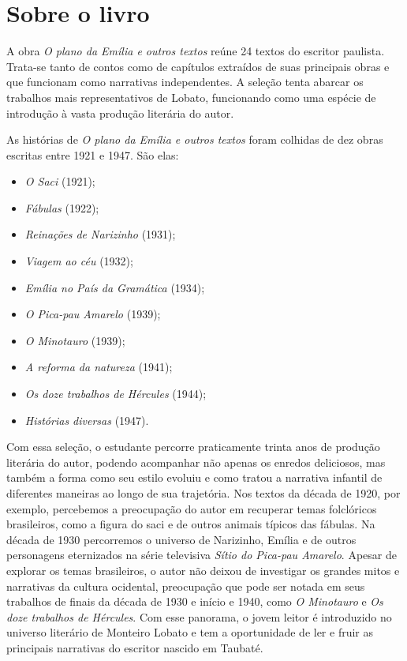 \documentclass[11pt]{extarticle}
\begin{document}
\section{Sobre o livro}
A obra \textit{O plano da Emília e outros textos} reúne 24 textos do escritor paulista.
Trata-se tanto de contos como de capítulos extraídos de suas principais obras e que funcionam como narrativas independentes. A seleção tenta abarcar os trabalhos mais representativos de Lobato, funcionando como uma espécie de introdução à vasta produção literária do autor.

As histórias de \textit{O plano da Emília e outros textos} foram colhidas de dez obras escritas entre 1921 e 1947. São elas:

\begin{itemize}
\item\textit{O Saci} (1921);
\item\textit{Fábulas} (1922);
\item\textit{Reinações de Narizinho} (1931);
\item\textit{Viagem ao céu} (1932);
\item\textit{Emília no País da Gramática} (1934);
\item\textit{O Pica-pau Amarelo} (1939);
\item\textit{O Minotauro} (1939);
\item\textit{A reforma da natureza} (1941);
\item\textit{Os doze trabalhos de Hércules} (1944);
\item\textit{Histórias diversas} (1947).
\end{itemize}

Com essa seleção, o estudante percorre praticamente trinta anos de produção literária do autor, podendo acompanhar não apenas os enredos deliciosos, mas também a forma como seu estilo evoluiu e como tratou a narrativa infantil de diferentes maneiras ao longo de sua trajetória. Nos textos da década de 1920, por exemplo, percebemos a preocupação do autor em recuperar temas folclóricos brasileiros, como a figura do saci e de outros animais típicos das fábulas. Na década de 1930 percorremos o universo de Narizinho, Emília e de outros personagens eternizados na série televisiva \textit{Sítio do Pica-pau Amarelo}.
Apesar de explorar os temas brasileiros, o autor não deixou de investigar os grandes mitos e narrativas da cultura ocidental, preocupação que pode ser notada em seus trabalhos de finais da década de 1930 e início e 1940, como \textit{O Minotauro} e \textit{Os doze trabalhos de Hércules}. Com esse panorama, o jovem leitor é introduzido no universo literário de Monteiro Lobato e tem a oportunidade de ler e fruir as principais narrativas do escritor nascido em Taubaté.
\end{document}
